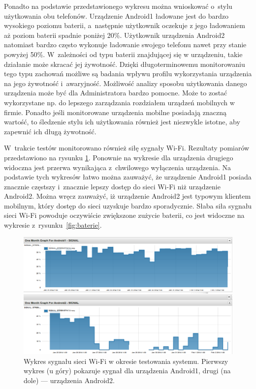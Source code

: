 Ponadto na podstawie przedstawionego wykresu można wnioskować o~stylu
użytkowania obu telefonów. Urządzenie Android1 ładowane jest do bardzo
wysokiego poziomu baterii, a~następnie użytkownik oczekuje z jego
ładowaniem aż poziom baterii spadnie poniżej 20\%. Użytkownik
urządzenia Android2 natomiast bardzo często wykonuje ładowanie swojego
telefonu nawet przy stanie powyżej 50\%. W~zależności od typu baterii
znajdującej się w urządzeniu, takie działanie może skracać jej
żywotność. Dzięki długoterminowemu monitorowaniu tego typu zachowań
możliwe są badania wpływu profilu wykorzystania urządzenia na jego
żywotność i~awaryjność. Możliwość analizy sposobu użytkowania danego
urządzenia może być dla Administratora bardzo pomocne. Może to zostać
wykorzystane np. do lepszego zarządzania rozdziałem urządzeń mobilnych
w firmie. Ponadto jeśli monitorowane urządzenia mobilne posiadają
znaczną wartość, to śledzenie stylu ich użytkowania również jest
niezwykle istotne, aby zapewnić ich długą żywotność.

W~trakcie testów monitorowano również siłę sygnały Wi-Fi. Rezultaty
pomiarów przedstawiono na rysunku \ref{fig:signals}. Ponownie na
wykresie dla urządzenia drugiego widoczna jest przerwa wynikająca
z~chwilowego wyłączenia urządzenia. Na podstawie tych wykresów łatwo
można zauważyć, że urządzenie Android1 posiada znacznie częstszy
i~znacznie lepszy dostęp do sieci Wi-Fi niż urządzenie Android2. Można
wręcz zauważyć, iż urządzenie Android2 jest typowym klientem mobilnym,
który dostęp do sieci uzyskuje bardzo sporadycznie. Słaba siła sygnału
sieci Wi-Fi powoduje oczywiście zwiększone zużycie baterii, co jest
widoczne na wykresie z~rysunku~\ref{fig:baterie}.

\begin{figure}[ht]
  \caption{Wykres sygnału sieci Wi-Fi w okresie testowania
    systemu. Pierwszy wykres (u góry) pokazuje sygnał dla urządzenia
    Android1, drugi (na dole) --- urządzenia Android2.}
  \label{fig:signals}
  \centering
\includegraphics[width=1\textwidth]{img/wifi.png}
\end{figure}

